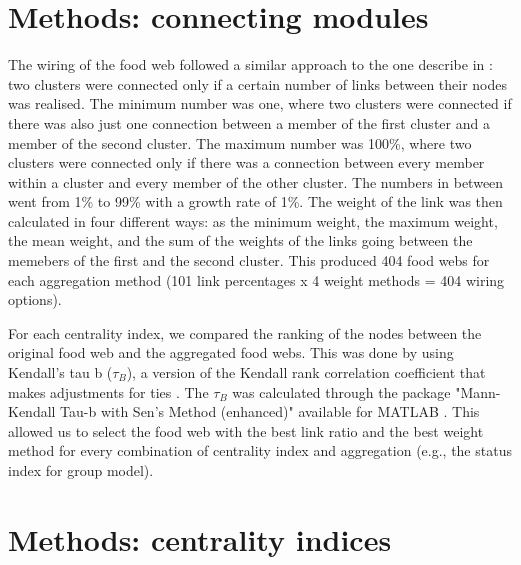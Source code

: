\documentclass[twocolumn]{article}
\begin{document}
\section*{Methods: connecting modules}
	\par
	The wiring of the food web followed a similar approach to the one describe in \citep{Martinez1991}: two clusters were connected only if a certain number of links between their nodes was realised. The minimum number was one, where two clusters were connected if there was also just one connection between a member of the first cluster and a member of the second cluster.	The maximum number was 100\%, where two clusters were connected only if there was a connection between every member within a cluster and every member of the other cluster.	The numbers in between went from 1\% to 99\% with a growth rate of 1\%.	The weight of the link was then calculated in four different ways: as the minimum weight, the maximum weight, the mean weight, and the sum of the weights of the links going between the memebers of the first and the second cluster. This produced 404 food webs for each aggregation method (101 link percentages x 4 weight methods = 404 wiring options).
	\par
	For each centrality index, we compared the ranking of the nodes between the original food web and the aggregated food webs.	This was done by using Kendall's tau b ($\tau_B$),  a version of the Kendall rank correlation coefficient that makes adjustments for ties \citep{Agresti2012}.	The $\tau_B$ was calculated through the package "Mann-Kendall Tau-b with Sen's Method (enhanced)" available for MATLAB \citep{Burkey2021}. This allowed us to select the food web with the best link ratio and the best weight method for every combination of centrality index and aggregation (e.g., the status index for group model).
\section*{Methods: centrality indices}
\end{document}
